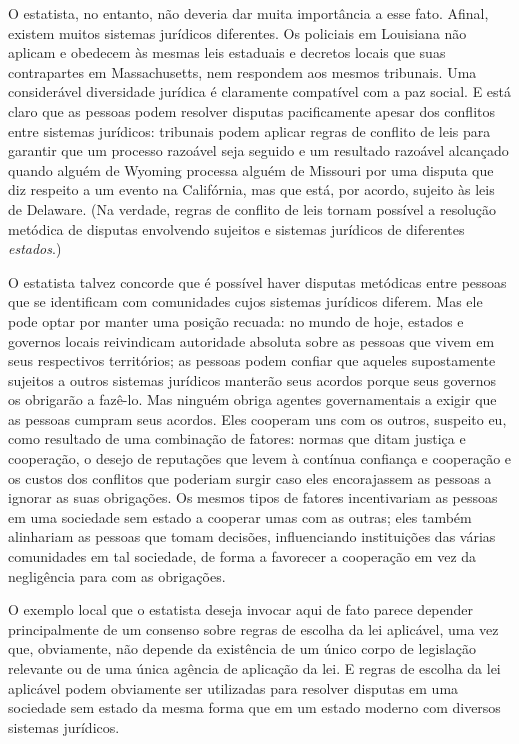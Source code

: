 O estatista, no entanto, não deveria dar muita importância a esse fato. Afinal, existem muitos sistemas jurídicos diferentes. Os policiais em Louisiana não aplicam e obedecem às mesmas leis estaduais e decretos locais que suas contrapartes em Massachusetts, nem respondem aos mesmos tribunais. Uma considerável diversidade jurídica é claramente compatível com a paz social. E está claro que as pessoas podem resolver disputas pacificamente apesar dos conflitos entre sistemas jurídicos: tribunais podem aplicar regras de conflito de leis para garantir que um processo razoável seja seguido e um resultado razoável alcançado quando alguém de Wyoming processa alguém de Missouri por uma disputa que diz respeito a um evento na Califórnia, mas que está, por acordo, sujeito às leis de Delaware. (Na verdade, regras de conflito de leis tornam possível a resolução metódica de disputas envolvendo sujeitos e sistemas jurídicos de diferentes \emph{estados}.)

O estatista talvez concorde que é possível haver disputas metódicas entre pessoas que se identificam com comunidades cujos sistemas jurídicos diferem. Mas ele pode optar por manter uma posição recuada: no mundo de hoje, estados e governos locais reivindicam autoridade absoluta sobre as pessoas que vivem em seus respectivos territórios; as pessoas podem confiar que aqueles supostamente sujeitos a outros sistemas jurídicos manterão seus acordos porque seus governos os obrigarão a fazê-lo. Mas ninguém obriga agentes governamentais a exigir que as pessoas cumpram seus acordos. Eles cooperam uns com os outros, suspeito eu, como resultado de uma combinação de fatores: normas que ditam justiça e cooperação, o desejo de reputações que levem à contínua confiança e cooperação e os custos dos conflitos que poderiam surgir caso eles encorajassem as pessoas a ignorar as suas obrigações. Os mesmos tipos de fatores incentivariam as pessoas em uma sociedade sem estado a cooperar umas com as outras; eles também alinhariam as pessoas que tomam decisões, influenciando instituições das várias comunidades em tal sociedade, de forma a favorecer a cooperação em vez da negligência para com as obrigações.

O exemplo local que o estatista deseja invocar aqui de fato parece depender principalmente de um consenso sobre regras de escolha da lei aplicável, uma vez que, obviamente, não depende da existência de um único corpo de legislação relevante ou de uma única agência de aplicação da lei. E regras de escolha da lei aplicável podem obviamente ser utilizadas para resolver disputas em uma sociedade sem estado da mesma forma que em um estado moderno com diversos sistemas jurídicos. 

